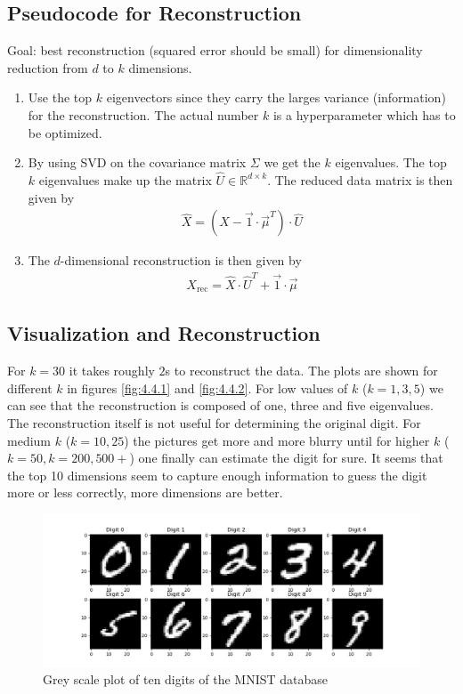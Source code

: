 \documentclass[12pt]{article}
\begin{document}
\subsection{Pseudocode for Reconstruction}

Goal: best reconstruction (squared error should be small) for dimensionality reduction from $d$ to $k$ dimensions.
\begin{enumerate}
	\item Use the top $k$ eigenvectors since they carry the larges variance (information) for the reconstruction. The actual number $k$ is a hyperparameter which has to be optimized.
	\item By using SVD on the covariance matrix $\Sigma$ we get the $k$ eigenvalues. The top $k$ eigenvalues make up the matrix $\hat{U}\in \mathbb{R}^{d \times k}$. The reduced data matrix is then given by
	\begin{align}
	\hat{X} = \left( X - \vec{1}\cdot \vec{\mu}^T \right)\cdot \hat{U} 
	\end{align}
	\item The $d$-dimensional reconstruction is then given by
	\begin{align}
	X_\text{rec} = \hat{X}\cdot \hat{U}^T + \vec{1}\cdot\vec{\mu}
	\end{align}
\end{enumerate}

\subsection{Visualization and Reconstruction}

For $k=30$ it takes roughly $2$s to reconstruct the data. The plots are shown for different $k$ in figures \ref{fig:4.4.1} and \ref{fig:4.4.2}. For low values of $k$ ($k=1,3,5$) we can see that the reconstruction is composed of one, three and five eigenvalues. The reconstruction itself is not useful for determining the original digit. For medium $k$ ($k=10,25$) the pictures get more and more blurry until for higher $k$ ($k=50,k=200,500+$) one finally can estimate the digit for sure. It seems that the top 10 dimensions seem to capture enough information to guess the digit more or less correctly, more dimensions are better. 

\begin{figure}[h!]
	\centering
	\includegraphics[width=\linewidth]{../Problem_4/Problem_4.1.1.png}
	\caption{Grey scale plot of ten digits of the MNIST database}
	\label{fig:4.1.1}
\end{figure}
\end{document}
